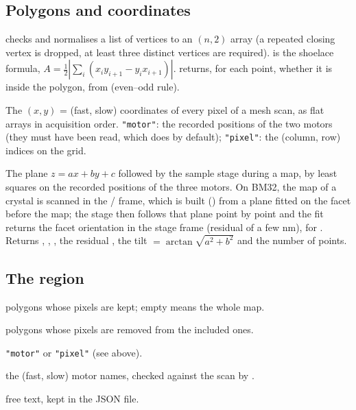 
\subsection{Polygons and coordinates}

 checks and normalises a list of vertices to an $(n,2)$ array (a repeated
closing vertex is dropped, at least three distinct vertices are required).
 is the shoelace formula,
$A = \tfrac12\left|\sum_i (x_i y_{i+1} - y_i x_{i+1})\right|$.
 returns, for each point, whether it is inside the polygon, from
 (even--odd rule).

The $(x, y)$ = (fast, slow) coordinates of every pixel of a mesh scan, as flat arrays in
acquisition order. \texttt{"motor"}: the recorded positions of the two motors (they must have
been read, which  does by default); \texttt{"pixel"}: the
(column, row) indices on the  grid.

The plane $z = ax + by + c$ followed by the sample stage during a map, by least squares on the
recorded positions of the three motors. On BM32, the map of a crystal is scanned in the
/ frame, which is built () from a plane fitted on the facet before
the map; the stage then follows that plane point by point and the fit returns the facet
orientation in the stage frame (residual of a few nm), for . Returns
, , , the residual , the tilt  $= \arctan\sqrt{a^2+b^2}$
and the number of points.

\subsection{The region}

\begin{args}
\item[include] polygons whose pixels are kept; empty means the whole map.
\item[exclude] polygons whose pixels are removed from the included ones.
\item[units] \texttt{"motor"} or \texttt{"pixel"} (see above).
\item[motors] the (fast, slow) motor names, checked against the scan by .
\item[name, note] free text, kept in the JSON file.
\end{args}

